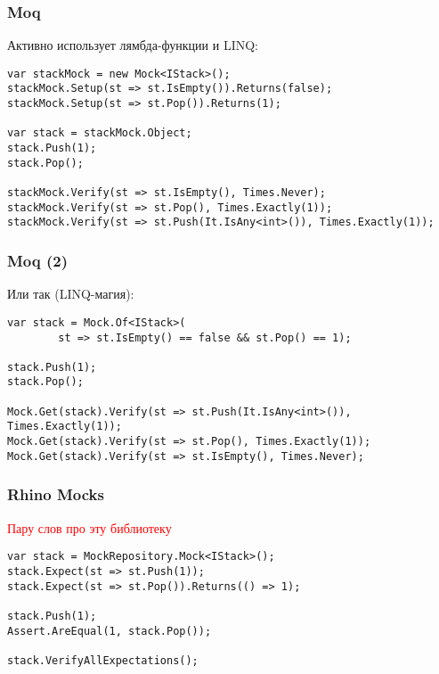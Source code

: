 \documentclass[xetex,mathserif,serif]{beamer}
\begin{document}
	\begin{frame}[fragile]
		\frametitle{Moq}
		Активно использует лямбда-функции и LINQ:
		\vspace{3mm}
		\begin{verbatim}
var stackMock = new Mock<IStack>();
stackMock.Setup(st => st.IsEmpty()).Returns(false);
stackMock.Setup(st => st.Pop()).Returns(1);

var stack = stackMock.Object;
stack.Push(1);
stack.Pop();

stackMock.Verify(st => st.IsEmpty(), Times.Never);
stackMock.Verify(st => st.Pop(), Times.Exactly(1));
stackMock.Verify(st => st.Push(It.IsAny<int>()), Times.Exactly(1));
		\end{verbatim}
	\end{frame}

	\begin{frame}[fragile]
		\frametitle{Moq (2)}
		Или так (LINQ-магия):
		\vspace{3mm}
		\begin{verbatim}
var stack = Mock.Of<IStack>(
        st => st.IsEmpty() == false && st.Pop() == 1);

stack.Push(1);
stack.Pop();

Mock.Get(stack).Verify(st => st.Push(It.IsAny<int>()), Times.Exactly(1));
Mock.Get(stack).Verify(st => st.Pop(), Times.Exactly(1));
Mock.Get(stack).Verify(st => st.IsEmpty(), Times.Never);
		\end{verbatim}
	\end{frame}

	\begin{frame}[fragile]
		\frametitle{Rhino Mocks}
		\textcolor{red}{Пару слов про эту библиотеку}
		\vspace{3mm}
		\begin{verbatim}
var stack = MockRepository.Mock<IStack>();
stack.Expect(st => st.Push(1));
stack.Expect(st => st.Pop()).Returns(() => 1);

stack.Push(1);
Assert.AreEqual(1, stack.Pop());

stack.VerifyAllExpectations();
		\end{verbatim}
	\end{frame}
\end{document}
